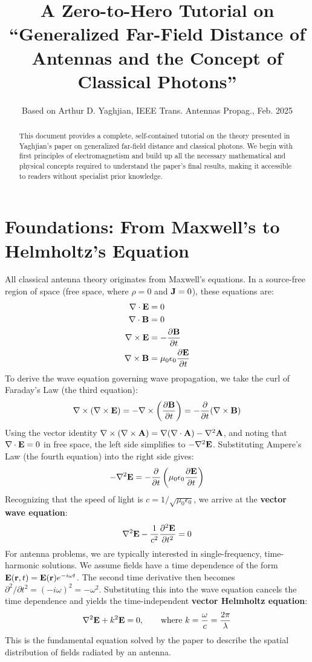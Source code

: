 \documentclass[11pt]{article}
\title{\texorpdfstring{A Zero-to-Hero Tutorial on \\
``Generalized Far-Field Distance of Antennas and the Concept of Classical Photons''}{A Zero-to-Hero Tutorial on "Generalized Far-Field Distance of Antennas and the Concept of Classical Photons"}}
\author{Based on Arthur D. Yaghjian, IEEE Trans. Antennas Propag., Feb. 2025}
\date{}
\begin{document}
\maketitle

\begin{abstract}
This document provides a complete, self-contained tutorial on the theory presented in Yaghjian's paper on generalized far-field distance and classical photons. We begin with first principles of electromagnetism and build up all the necessary mathematical and physical concepts required to understand the paper's final results, making it accessible to readers without specialist prior knowledge.
\end{abstract}

\tableofcontents

\section{Foundations: From Maxwell's to Helmholtz's Equation}

All classical antenna theory originates from Maxwell's equations. In a source-free region of space (free space, where $\rho=0$ and $\vb J = 0$), these equations are:
\begin{align*}
    \nabla \cdot \vb E &= 0 \\
    \nabla \cdot \vb B &= 0 \\
    \nabla \times \vb E &= -\frac{\partial \vb B}{\partial t} \\
    \nabla \times \vb B &= \mu_0 \epsilon_0 \frac{\partial \vb E}{\partial t}
\end{align*}
To derive the wave equation governing wave propagation, we take the curl of Faraday's Law (the third equation):
\[
\nabla \times (\nabla \times \vb E) = -\nabla \times \left(\frac{\partial \vb B}{\partial t}\right) = -\frac{\partial}{\partial t}(\nabla \times \vb B)
\]
Using the vector identity $\nabla \times (\nabla \times \vb A) = \nabla(\nabla \cdot \vb A) - \nabla^2 \vb A$, and noting that $\nabla \cdot \vb E = 0$ in free space, the left side simplifies to $-\nabla^2 \vb E$. Substituting Ampere's Law (the fourth equation) into the right side gives:
\[
-\nabla^2 \vb E = -\frac{\partial}{\partial t}\left(\mu_0 \epsilon_0 \frac{\partial \vb E}{\partial t}\right)
\]
Recognizing that the speed of light is $c=1/\sqrt{\mu_0\epsilon_0}$, we arrive at the \textbf{vector wave equation}:
\[
\nabla^2 \vb E - \frac{1}{c^2} \frac{\partial^2 \vb E}{\partial t^2} = 0
\]
For antenna problems, we are typically interested in single-frequency, time-harmonic solutions. We assume fields have a time dependence of the form $\vb E(\vb r, t) = \vb E(\vb r) e^{-i\omega t}$. The second time derivative then becomes $\partial^2/\partial t^2 = (-i\omega)^2 = -\omega^2$. Substituting this into the wave equation cancels the time dependence and yields the time-independent \textbf{vector Helmholtz equation}:
\begin{equation}
\nabla^2 \vb E + k^2 \vb E = 0, \qquad \text{where } k = \frac{\omega}{c} = \frac{2\pi}{\lambda}
\end{equation}
This is the fundamental equation solved by the paper to describe the spatial distribution of fields radiated by an antenna.
\end{document}
